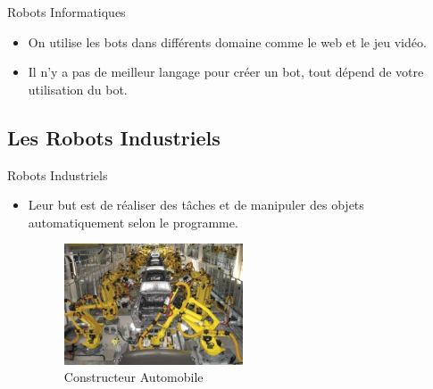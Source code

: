 \documentclass{beamer}
\begin{document}
\begin{frame}{Robots Informatiques}
\begin{itemize}
    \item On utilise les bots dans différents domaine comme le web et le jeu vidéo.
    \item Il n'y a pas de meilleur langage pour créer un bot, tout dépend de votre utilisation du bot. 
\end{itemize}
\end{frame}
\subsection{Les Robots Industriels}
\begin{frame}{Robots Industriels}

\begin{itemize}
    \item Leur but est de réaliser des tâches et de manipuler des objets automatiquement selon le programme. 
    \begin{figure}
        \centering
        \includegraphics[width=200]{img/auto.png}
        \caption{Constructeur Automobile}
        \label{fig:my_label}
    \end{figure}
    
\end{itemize}
\end{frame}
\end{document}
